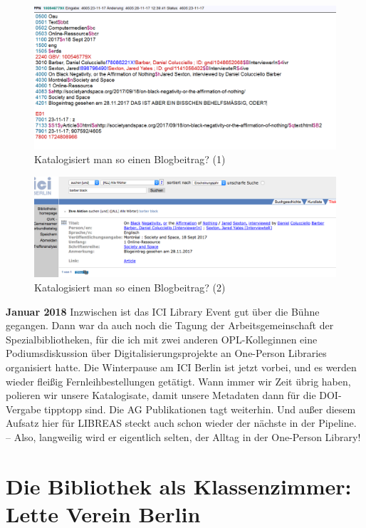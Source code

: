 \documentclass[a4paper,
fontsize=11pt,
oneside,
numbers=noperiodatend,
parskip=half-,
bibliography=totoc,
final
]{scrartcl}
\begin{document}
\begin{figure}
\centering
\includegraphics{img/Haas_5.png}
\caption{Katalogisiert man so einen Blogbeitrag? (1)}
\end{figure}

\begin{figure}
\centering
\includegraphics{img/Haas_6.png}
\caption{Katalogisiert man so einen Blogbeitrag? (2)}
\end{figure}

\textbf{Januar 2018} Inzwischen ist das ICI Library Event gut über die
Bühne gegangen. Dann war da auch noch die Tagung der Arbeitsgemeinschaft
der Spezialbibliotheken, für die ich mit zwei anderen OPL-Kolleginnen
eine Podiumsdiskussion über Digitalisierungsprojekte an One-Person
Libraries organisiert hatte. Die Winterpause am ICI Berlin ist jetzt
vorbei, und es werden wieder fleißig Fernleihbestellungen getätigt. Wann
immer wir Zeit übrig haben, polieren wir unsere Katalogisate, damit
unsere Metadaten dann für die DOI-Vergabe tipptopp sind. Die AG
Publikationen tagt weiterhin. Und außer diesem Aufsatz hier für LIBREAS
steckt auch schon wieder der nächste in der Pipeline. -- Also,
langweilig wird er eigentlich selten, der Alltag in der One-Person
Library!

\hypertarget{die-bibliothek-als-klassenzimmer-lette-verein-berlin}{%
\section*{Die Bibliothek als Klassenzimmer: Lette Verein
Berlin}\label{die-bibliothek-als-klassenzimmer-lette-verein-berlin}}
\end{document}
